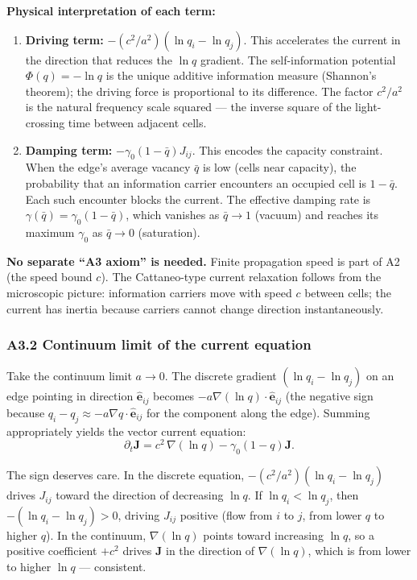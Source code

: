 \documentclass[reprint]{revtex4-2}
\begin{document}
\textbf{Physical interpretation of each term:}
\begin{enumerate}[label=(\roman*)]
\item \textbf{Driving term:} $-(c^2/a^2)(\ln q_i - \ln q_j)$. This accelerates the current in the direction that reduces the $\ln q$ gradient. The self-information potential $\Phi(q)=-\ln q$ is the unique additive information measure (Shannon's theorem); the driving force is proportional to its difference. The factor $c^2/a^2$ is the natural frequency scale squared --- the inverse square of the light-crossing time between adjacent cells.
\item \textbf{Damping term:} $-\gamma_0(1-\bar{q})J_{ij}$. This encodes the capacity constraint. When the edge's average vacancy $\bar{q}$ is low (cells near capacity), the probability that an information carrier encounters an occupied cell is $1-\bar{q}$. Each such encounter blocks the current. The effective damping rate is $\gamma(\bar{q}) = \gamma_0(1-\bar{q})$, which vanishes as $\bar{q}\to 1$ (vacuum) and reaches its maximum $\gamma_0$ as $\bar{q}\to 0$ (saturation).
\end{enumerate}

\textbf{No separate ``A3 axiom'' is needed.} Finite propagation speed is part of A2 (the speed bound $c$). The Cattaneo-type current relaxation follows from the microscopic picture: information carriers move with speed $c$ between cells; the current has inertia because carriers cannot change direction instantaneously.

\subsubsection{A3.2 Continuum limit of the current equation}

Take the continuum limit $a\to 0$. The discrete gradient $(\ln q_i - \ln q_j)$ on an edge pointing in direction $\hat{\mathbf{e}}_{ij}$ becomes $-a\nabla(\ln q)\cdot\hat{\mathbf{e}}_{ij}$ (the negative sign because $q_i - q_j \approx -a\nabla q\cdot\hat{\mathbf{e}}_{ij}$ for the component along the edge). Summing appropriately yields the vector current equation:
\begin{equation}
\partial_t \mathbf{J} = c^2\,\nabla(\ln q) - \gamma_0(1-q)\mathbf{J}.
\label{eq:a3_continuum_current}
\end{equation}

The sign deserves care. In the discrete equation, $-(c^2/a^2)(\ln q_i - \ln q_j)$ drives $J_{ij}$ toward the direction of decreasing $\ln q$. If $\ln q_i < \ln q_j$, then $-(\ln q_i-\ln q_j) > 0$, driving $J_{ij}$ positive (flow from $i$ to $j$, from lower $q$ to higher $q$). In the continuum, $\nabla(\ln q)$ points toward increasing $\ln q$, so a positive coefficient $+c^2$ drives $\mathbf{J}$ in the direction of $\nabla(\ln q)$, which is from lower to higher $\ln q$ --- consistent.
\end{document}
